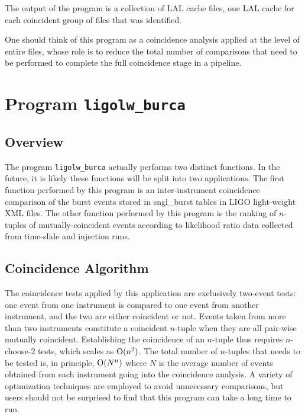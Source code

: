 \documentclass[10pt]{article}
\newcommand{\prog}[1]{\texttt{#1}}
\begin{document}
The output of the program is a collection of LAL cache files, one LAL cache
for each coincident group of files that was identified.

One should think of this program as a coincidence analysis applied at the
level of entire files, whose role is to reduce the total number of
comparisons that need to be performed to complete the full coincidence
stage in a pipeline.


\section{Program \prog{ligolw\_burca}}


\subsection{Overview}


The program \prog{ligolw\_burca} actually performs two distinct functions.
In the future, it is likely these functions will be split into two
applications.  The first function performed by this program is an
inter-instrument coincidence comparison of the burst events stored in
sngl\_burst tables in LIGO light-weight XML files.  The other function
performed by this program is the ranking of \(n\)-tuples of
mutually-coincident events according to likelihood ratio data collected
from time-slide and injection runs.


\subsection{Coincidence Algorithm}


The coincidence tests applied by this application are exclusively two-event
tests:  one event from one instrument is compared to one event from another
instrument, and the two are either coincident or not.  Events taken from
more than two instruments constitute a coincident \(n\)-tuple when they are
all pair-wise mutually coincident.  Establishing the coincidence of an
\(n\)-tuple thus requires \(n\)-choose-2 tests, which scales as
\(\operatorname{O}(n^{2})\).  The total number of \(n\)-tuples that needs to be
tested is, in principle, \(\operatorname{O}(N^{n})\) where \(N\) is the average
number of events obtained from each instrument going into the coincidence
analysis.  A variety of optimization techniques are employed to avoid
unnecessary comparisons, but users should not be surprised to find that
this program can take a long time to run.
\end{document}
